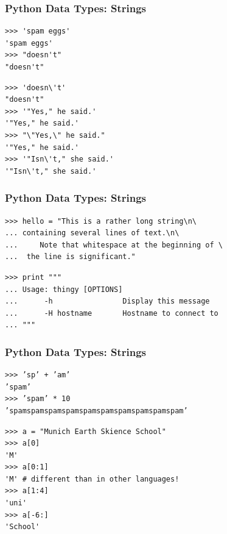 \documentclass[t,10pt,compress=false,usepdftitle=false]{beamer}
\begin{document}
\begin{frame}[fragile]
    \frametitle{Python Data Types: Strings}
    \begin{myColorBox}{0.9}{}
\begin{verbatim}
>>> 'spam eggs'
'spam eggs'
>>> "doesn't"
"doesn't"
\end{verbatim}
    \end{myColorBox}
    \pause
    \begin{myColorBox}{0.9}{}
\begin{verbatim}
>>> 'doesn\'t'
"doesn't"
>>> '"Yes," he said.'
'"Yes," he said.'
>>> "\"Yes,\" he said."
'"Yes," he said.'
>>> '"Isn\'t," she said.'
'"Isn\'t," she said.'
\end{verbatim}
    \end{myColorBox}
\end{frame}


\begin{frame}[fragile]
    \frametitle{Python Data Types: Strings}
    \begin{myColorBox}{0.9}{}
\begin{verbatim}
>>> hello = "This is a rather long string\n\
... containing several lines of text.\n\
...     Note that whitespace at the beginning of \
...  the line is significant."
\end{verbatim}
    \end{myColorBox}
    \pause
    \begin{myColorBox}{0.9}{}
\begin{verbatim}
>>> print """
... Usage: thingy [OPTIONS]
...      -h                Display this message
...      -H hostname       Hostname to connect to
... """
\end{verbatim}
    \end{myColorBox}
\end{frame}


\begin{frame}[fragile]
    \frametitle{Python Data Types: Strings}
    \begin{myColorBox}{0.9}{}
\begin{verbatim}
>>> ’sp’ + ’am’
’spam’
>>> ’spam’ * 10
’spamspamspamspamspamspamspamspamspamspam’
\end{verbatim}
    \end{myColorBox}
    \pause
    \begin{myColorBox}{0.9}{}
\begin{verbatim}
>>> a = "Munich Earth Skience School"
>>> a[0]
'M'
>>> a[0:1]
'M' # different than in other languages!
>>> a[1:4]
'uni'
>>> a[-6:]
'School'
\end{verbatim}
    \end{myColorBox}
\end{frame}
\end{document}
